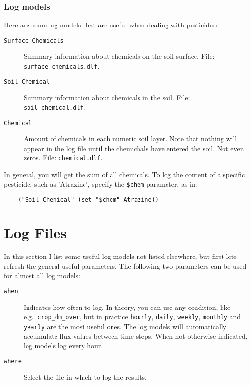 \documentclass[a4paper,11pt]{article}
\begin{document}

\subsubsection{Log models}

Here are some log models that are useful when dealing with pesticides:
\begin{description}
\item[\texttt{Surface Chemicals}] Summary information about chemicals
  on the soil surface. File: \texttt{surface\_chemicals.dlf}.
\item[\texttt{Soil Chemical}] Summary information about chemicals in
  the soil.  File: \texttt{soil\_chemical.dlf}. 
\item[\texttt{Chemical}] Amount of chemicals in each numeric soil
  layer.  Note that nothing will appear in the log file until the
  chemichals have entered the soil.  Not even zeros.  File:
  \texttt{chemical.dlf}.
\end{description}

In general, you will get the sum of all chemicals.  To log the content
of a specific pesticide, such as 'Atrazine', specify the \verb|$chem|%
parameter, as in:
\begin{verbatim}
    ("Soil Chemical" (set "$chem" Atrazine))
\end{verbatim}%

\section{Log Files}
\label{sec:output}

In this section I list some useful log models not listed elsewhere,
but first lets refresh the general useful parameters.  The following
two parameters can be used for almost all log models:
\begin{description}
\item[\texttt{when}] Indicates how often to log.  In theory, you can
  use any condition, like e.g.\ \texttt{crop\_dm\_over}, but in
  practice \texttt{hourly}, \texttt{daily}, \texttt{weekly},
  \texttt{monthly} and \texttt{yearly} are the most useful ones.  The
  log models will automatically accumulate flux values between time
  steps.  When not otherwise indicated, log models log every hour.
\item[\texttt{where}] Select the file in which to log the results.
\end{description}
\end{document}
